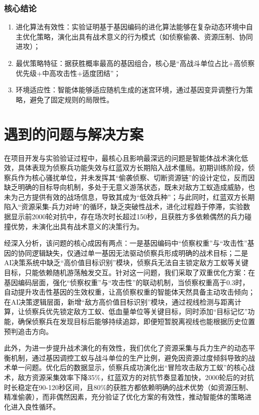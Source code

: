 \documentclass[12pt,a4paper]{article}
\begin{document}
	\subsubsection{核心结论}
	\begin{enumerate}
		\item 进化算法有效性：实验证明基于基因编码的进化算法能够在复杂动态环境中自主优化策略，演化出具有战术意义的行为模式（如侦察偷袭、资源压制、协同进攻）；
		\item 最优策略特征：据获胜概率最高的基因组合，核心是“高战斗单位占比+高侦察优先级+中高攻击性+适度团结”；
		\item 环境适应性：智能体能够适应随机生成的迷宫环境，通过基因变异调整行为策略，避免了固定规则的局限性。
	\end{enumerate}
	
	\section{遇到的问题与解决方案}
	在项目开发与实验验证过程中，最核心且影响最深远的问题是智能体战术演化低效，具体表现为侦察兵功能失效与红蓝双方长期陷入战术僵局。初期训练阶段，侦察兵作为核心骚扰单位，并未发挥其“偷袭侦察、切断资源链”的设计定位，反而因缺乏明确的目标导向机制，多处于无意义游荡状态，既未对敌方工蚁造成威胁，也未为己方提供有效的战场信息，导致其成为“低效兵种”；与此同时，红蓝双方长期陷入“资源采集-兵力对峙”的循环，缺乏突破性战术，进化过程趋于停滞，实验数据显示前2000轮对抗中，存在场次时长超过150秒，且获胜方多依赖偶然的兵力碰撞优势，未演化出具有战术意义的决策行为。
	
	经深入分析，该问题的核心成因有两点：一是基因编码中“侦察权重”与“攻击性”基因的协同逻辑缺失，仅通过单一基因无法驱动侦察兵形成明确的战术目标；二是AI决策系统中缺乏“高价值目标识别”模块，侦察兵无法自主锁定敌方工蚁等关键目标，只能依赖随机游荡触发交互。针对这一问题，我们采取了双重优化方案：在基因编码层面，强化“侦察权重”与“攻击性”的联动机制，当侦察权重高于0.3时，自动提升攻击性基因的生效权重，让高侦察权重的智能体天然具备主动攻击倾向；在AI决策逻辑层面，新增“敌方高价值目标识别”模块，通过视线检测与距离计算，让侦察兵优先锁定敌方工蚁、低血量单位等关键目标，同时添加“目标记忆”功能，确保侦察兵在发现目标后能够持续追踪，即便短暂脱离视线也能根据历史位置预判追击方向。
	
	此外，为进一步提升战术演化的有效性，我们优化了资源采集与兵力生产的动态平衡机制，通过基因调控工蚁与战斗单位的生产比例，避免因资源过度倾斜导致的战术单一问题。优化后的数据显示，侦察兵成功演化出“冒险攻击敌方工蚁”的核心战术，敌方资源采集效率下降35\%，红蓝双方的对抗节奏显着加快，2000轮后的对抗时长稳定在90-120秒区间，且80\%的获胜方都依赖明确的战术优势（如资源压制、精准偷袭），而非偶然因素，充分验证了优化方案的有效性，推动智能体的策略进化进入良性循环。
	
\end{document}
